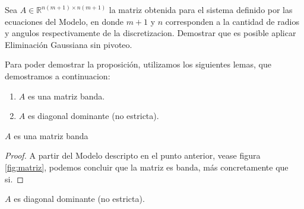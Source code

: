 \begin{proposition}
    Sea $A \in \mathbb{R}^{n(m+1) \times n(m+1)}$ la matriz obtenida para el sistema definido por las ecuaciones del Modelo, en donde $m+1$ y $n$ corresponden a la cantidad de radios y angulos respectivamente de la discretizacion. Demostrar que es posible aplicar Eliminación Gaussiana sin pivoteo.
\end{proposition}

Para poder demostrar la proposición, utilizamos los siguientes lemas, que demostramos a continuacion:

  \begin{enumerate}[label=(\subscript{L}{\arabic*})]
    \item $A$ es una matriz banda.
    \item $A$ es diagonal dominante (no estricta).

  \end{enumerate}

  \begin{lemma}
    $A$ es una matriz banda
  \end{lemma}

  \begin{proof}
    A partir del Modelo descripto en el punto anterior, vease figura \ref{fig:matriz}, podemos concluir que la matriz es banda, más concretamente que si.
  \end{proof}

  \begin{lemma}
    $A$ es diagonal dominante (no estricta).
  \end{lemma}

